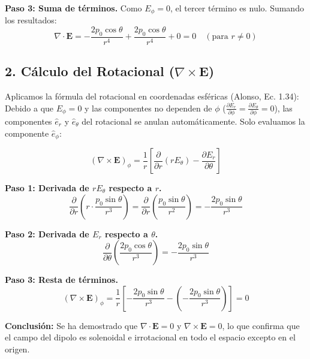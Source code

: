 \documentclass[a4paper]{article}
\begin{document}
\textbf{Paso 3: Suma de términos.}
Como $E_\phi = 0$, el tercer término es nulo. Sumando los resultados:
\begin{equation}
    \nabla \cdot \mathbf{E} = -\frac{2 p_0 \cos \theta}{r^4} + \frac{2 p_0 \cos \theta}{r^4} + 0 = 0 \quad (\text{para } r \neq 0)
\end{equation}

\subsection*{2. Cálculo del Rotacional ($\nabla \times \mathbf{E}$)}
Aplicamos la fórmula del rotacional en coordenadas esféricas (Alonso, Ec. 1.34):
Debido a que $E_\phi = 0$ y las componentes no dependen de $\phi$ ($\frac{\partial E_r}{\partial \phi} = \frac{\partial E_\theta}{\partial \phi} = 0$), las componentes $\hat{e}_r$ y $\hat{e}_\theta$ del rotacional se anulan automáticamente. Solo evaluamos la componente $\hat{e}_\phi$:

\begin{equation}
    (\nabla \times \mathbf{E})_\phi = \frac{1}{r} \left[ \frac{\partial}{\partial r} (r E_\theta) - \frac{\partial E_r}{\partial \theta} \right]
\end{equation}

\textbf{Paso 1: Derivada de $r E_\theta$ respecto a $r$.}
\begin{equation}
    \frac{\partial}{\partial r} \left( r \cdot \frac{p_0 \sin \theta}{r^3} \right) = \frac{\partial}{\partial r} \left( \frac{p_0 \sin \theta}{r^2} \right) = -\frac{2 p_0 \sin \theta}{r^3}
\end{equation}

\textbf{Paso 2: Derivada de $E_r$ respecto a $\theta$.}
\begin{equation}
    \frac{\partial}{\partial \theta} \left( \frac{2 p_0 \cos \theta}{r^3} \right) = -\frac{2 p_0 \sin \theta}{r^3}
\end{equation}

\textbf{Paso 3: Resta de términos.}
\begin{equation}
    (\nabla \times \mathbf{E})_\phi = \frac{1}{r} \left[ -\frac{2 p_0 \sin \theta}{r^3} - \left( -\frac{2 p_0 \sin \theta}{r^3} \right) \right] = 0
\end{equation}

\textbf{Conclusión:} Se ha demostrado que $\nabla \cdot \mathbf{E} = 0$ y $\nabla \times \mathbf{E} = 0$, lo que confirma que el campo del dipolo es solenoidal e irrotacional en todo el espacio excepto en el origen.



 
\end{document}

